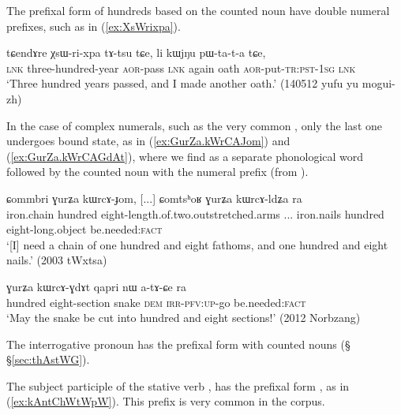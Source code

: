 The prefixal form of hundreds based on the counted noun  have double numeral prefixes, such as  in (\ref{ex:XsWrixpa}).

\begin{exe}
\ex \label{ex:XsWrixpa}
\gll tɕendɤre χsɯ-ri-xpa tɤ-tsu tɕe, li kɯjŋu pɯ-ta-t-a tɕe, \\
 \textsc{lnk} three-hundred-year \textsc{aor}-pass \textsc{lnk} again oath \textsc{aor}-put-\textsc{tr}:\textsc{pst}-\textsc{1sg} \textsc{lnk} \\
\glt `Three hundred years passed, and I made another oath.' (140512 yufu yu mogui-zh)
\end{exe}

In the case of complex numerals, such as the very common , only the last one undergoes bound state, as in (\ref{ex:GurZa.kWrCAJom}) and (\ref{ex:GurZa.kWrCAGdAt}), where we find  as a separate phonological word followed by the counted noun with the numeral prefix  (from ).

\begin{exe}
\ex \label{ex:GurZa.kWrCAJom}
\gll ɕommbri ɣurʑa kɯrcɤ-ɟom, [...] ɕomtsʰoʁ ɣurʑa kɯrcɤ-ldʑa ra \\
iron.chain hundred eight-length.of.two.outstretched.arms ... iron.nails hundred eight-long.object be.needed:\textsc{fact} \\
\glt  `[I] need a chain of one hundred and eight fathoms, and one hundred and eight nails.' (2003 tWxtsa)
\end{exe}

\begin{exe}
\ex \label{ex:GurZa.kWrCAGdAt}
\gll  ɣurʑa kɯrcɤ-ɣdɤt qapri nɯ a-tɤ-ɕe ra \\
 hundred eight-section snake \textsc{dem} \textsc{irr}-\textsc{pfv}:\textsc{up}-go be.needed:\textsc{fact} \\
\glt `May the snake be cut into hundred and eight sections!' (2012 Norbzang)
\end{exe}

The interrogative pronoun  has the prefixal form  with counted nouns (§ §\ref{sec:thAstWG}). 

The subject participle   of the stative verb ,  has the prefixal form , as in (\ref{ex:kAntChWtWpW}). This prefix is very common in the corpus.

